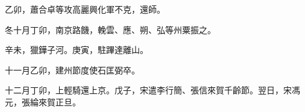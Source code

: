 \begin{pinyinscope}
 乙卯，蕭合卓等攻高麗興化軍不克，還師。



 冬十月丁卯，南京路饑，輓雲、應、朔、弘等州粟振之。



 辛未，獵鏵子河。庚寅，駐蹕達離山。



 十一月乙卯，建州節度使石匡弼卒。



 十二月丁卯，上輕騎還上京。戊子，宋遣李行簡、張信來賀千齡節。翌日，宋馮元，張綸來賀正旦。



\end{pinyinscope}